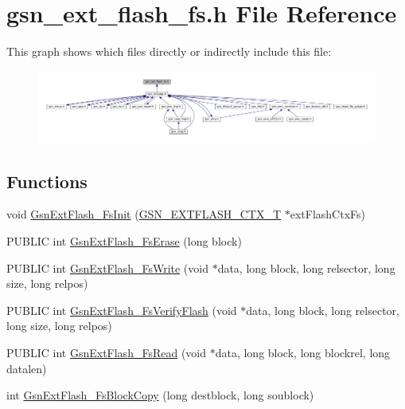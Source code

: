 \hypertarget{a00497}{
\section{gsn\_\-ext\_\-flash\_\-fs.h File Reference}
\label{a00497}
}
This graph shows which files directly or indirectly include this file:
\nopagebreak
\begin{figure}[H]
\begin{center}
\leavevmode
\includegraphics[width=400pt]{a00727}
\end{center}
\end{figure}
\subsection*{Functions}
\begin{DoxyCompactItemize}
\item 
void \hyperlink{a00497_a4e54bd2a8ac3aa4d4737326b9064f877}{GsnExtFlash\_\-FsInit} (\hyperlink{a00071}{GSN\_\-EXTFLASH\_\-CTX\_\-T} $\ast$extFlashCtxFs)
\item 
PUBLIC int \hyperlink{a00497_ae013dba6e714935f264c96c52aeb2b7f}{GsnExtFlash\_\-FsErase} (long block)
\item 
PUBLIC int \hyperlink{a00497_a26dd3d3c812972ea820601c0e82d0aa2}{GsnExtFlash\_\-FsWrite} (void $\ast$data, long block, long relsector, long size, long relpos)
\item 
PUBLIC int \hyperlink{a00497_a74f2f6bd003c08b24afa289f08b9ead5}{GsnExtFlash\_\-FsVerifyFlash} (void $\ast$data, long block, long relsector, long size, long relpos)
\item 
PUBLIC int \hyperlink{a00497_ad3a54c3de643ac909a23dfa50a8b4973}{GsnExtFlash\_\-FsRead} (void $\ast$data, long block, long blockrel, long datalen)
\item 
int \hyperlink{a00497_a6b3e26b1e22cb9114f29a0bdfdecc1cd}{GsnExtFlash\_\-FsBlockCopy} (long destblock, long soublock)
\end{DoxyCompactItemize}


